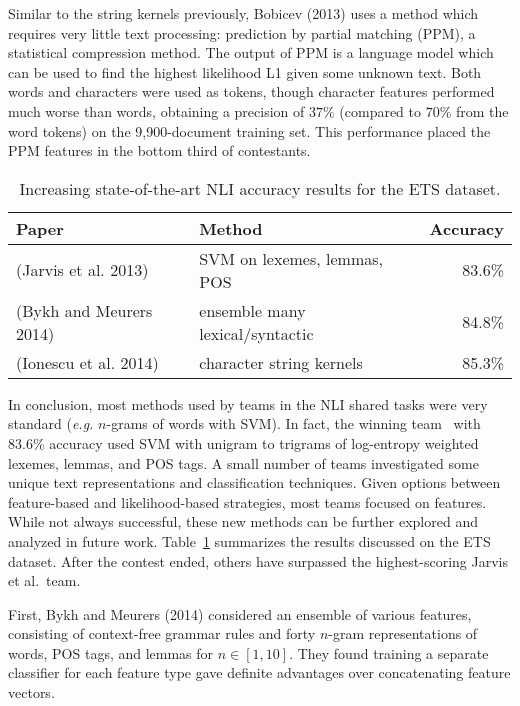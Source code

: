 Similar to the string kernels previously, Bobicev (2013) uses a method which
requires very little text processing: prediction by partial matching (PPM), a
statistical compression method. The output of PPM is a language model which can
be used to find the highest likelihood L1 given some unknown text. Both words
and characters were used as tokens, though character features performed much
worse than words, obtaining a precision of $37\%$ (compared to $70\%$ from the
word tokens) on the 9,900-document training set. This performance placed the PPM
features in the bottom third of contestants.

\begin{table}[t]
\begin{center}
    \begin{tabular}{llr}
        \hline
        \hline
        \textbf{Paper} & \textbf{Method} & \textbf{Accuracy} \\
        \hline
        \hline
        (Jarvis et al. 2013) & SVM on lexemes, lemmas, POS & 83.6\% \\
        \hline
        (Bykh and Meurers 2014) & ensemble many lexical/syntactic & 84.8\% \\
        \hline
        (Ionescu et al. 2014) & character string kernels & 85.3\% \\
        \hline
        \hline
    \end{tabular}
    \caption{Increasing state-of-the-art NLI accuracy results for the ETS
    dataset.}
    \label{table:ets}
\end{center}
\end{table}

In conclusion, most methods used by teams in the NLI shared tasks were very
standard (\emph{e.g.} $n$-grams of words with SVM). In fact, the winning
team~\cite{jarvis} with 83.6\% accuracy used SVM with unigram to trigrams of
log-entropy weighted lexemes, lemmas, and POS tags. A small number of teams
investigated some unique text representations and classification techniques.
Given options between feature-based and likelihood-based strategies, most teams
focused on features. While not always successful, these new methods can be
further explored and analyzed in future work. Table~\ref{table:ets} summarizes
the results discussed on the ETS dataset. After the contest ended, others
have surpassed the highest-scoring Jarvis et al.\ team.

First, Bykh and Meurers (2014) considered an ensemble of various
features, consisting of context-free grammar rules and forty $n$-gram
representations of words, POS tags, and lemmas for $n\in[1,10]$. They found
training a separate classifier for each feature type gave definite advantages
over concatenating feature vectors.

